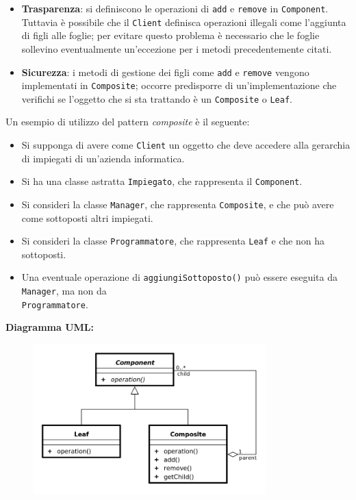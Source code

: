 \begin{solution}
\begin{itemize}
\item \textbf{Trasparenza}: si definiscono le operazioni di \texttt{add} e \texttt{remove} in \texttt{Component}.
Tuttavia è possibile che il \texttt{Client} definisca operazioni illegali come l'aggiunta di figli alle foglie; per evitare questo problema è necessario che le foglie sollevino eventualmente un'eccezione per i metodi precedentemente citati.
	\item \textbf{Sicurezza}: i metodi di gestione dei figli come \texttt{add} e \texttt{remove} vengono implementati in \texttt{Composite}; occorre predisporre di un'implementazione che verifichi se l'oggetto che si sta trattando è un \texttt{Composite} o \texttt{Leaf}.
\end{itemize}
Un esempio di utilizzo del pattern \textit{composite} è il seguente:
\begin{itemize}
\item Si supponga di avere come \texttt{Client} un oggetto che deve accedere alla gerarchia di impiegati di un'azienda informatica.
\item Si ha una classe astratta \texttt{Impiegato}, che rappresenta il \texttt{Component}.
\item Si consideri la classe \texttt{Manager}, che rappresenta \texttt{Composite}, e che può avere come sottoposti altri impiegati.
\item Si consideri la classe \texttt{Programmatore}, che rappresenta \texttt{Leaf} e che non ha sottoposti.
\item Una eventuale operazione di \texttt{aggiungiSottoposto()} può essere eseguita da \texttt{Manager}, ma non da
\\
\texttt{Programmatore}.
\end{itemize}
\textbf{Diagramma UML:}
\begin{figure}[htb!]
	\centering
	\includegraphics[width=9cm]{./immagini/compositePattern.png}
\end{figure}
\end{solution}



